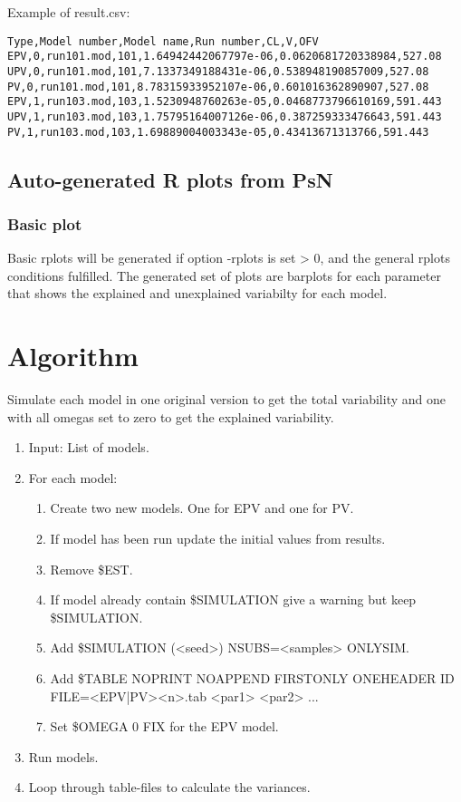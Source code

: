 Example of result.csv:
\begin{verbatim}
Type,Model number,Model name,Run number,CL,V,OFV
EPV,0,run101.mod,101,1.64942442067797e-06,0.0620681720338984,527.08
UPV,0,run101.mod,101,7.1337349188431e-06,0.538948190857009,527.08
PV,0,run101.mod,101,8.78315933952107e-06,0.601016362890907,527.08
EPV,1,run103.mod,103,1.5230948760263e-05,0.0468773796610169,591.443
UPV,1,run103.mod,103,1.75795164007126e-06,0.387259333476643,591.443
PV,1,run103.mod,103,1.69889004003343e-05,0.43413671313766,591.443
\end{verbatim}

\subsection{Auto-generated R plots from PsN}
\newcommand{\rplotsconditions}{The default pvar template requires no extra R libraries.}


\subsubsection*{Basic plot}
Basic rplots will be generated if option -rplots is set > 0, and the general rplots conditions fulfilled. The generated set of plots are barplots for each parameter that shows the explained and unexplained variabilty for each model.


\section{Algorithm}

Simulate each model in one original version to get the total variability and one with all omegas set to zero to get the explained variability.

\begin{enumerate}
	\item Input: List of models.
	\item For each model:
	\begin{enumerate}
		\item Create two new models. One for EPV and one for PV.
		\item If model has been run update the initial values from results.
		\item Remove \$EST.
		\item If model already contain \$SIMULATION give a warning but keep \$SIMULATION.
		\item Add \$SIMULATION (<seed>) NSUBS=<samples> ONLYSIM.
		\item Add \$TABLE NOPRINT NOAPPEND FIRSTONLY ONEHEADER ID FILE=<EPV|PV><n>.tab <par1> <par2> ...
		\item Set \$OMEGA 0 FIX for the EPV model.
	\end{enumerate}
	\item Run models.
	\item Loop through table-files to calculate the variances.
\end{enumerate}




